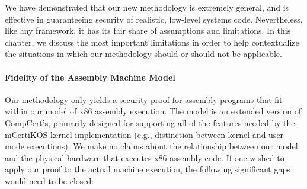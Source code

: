 \label{limitations-chapter}

We have demonstrated that our new methodology is extremely
general, and is effective in guaranteeing security of realistic,
low-level systems code. Nevertheless, like any framework, it
has its fair share of assumptions and limitations. In this 
chapter, we discuss the most important limitations in order to 
help contextualize the situations in which our methodology
should or should not be applicable.

\paragraph{Fidelity of the Assembly Machine Model}
Our methodology only yields a security proof for assembly
programs that fit within our model of x86 assembly execution. The
model is an extended version of CompCert's, primarily designed
for supporting all of the features needed by the mCertiKOS
kernel implementation (e.g., distinction between kernel and
user mode executions). We make no claims about the relationship
between our model and the physical hardware that executes x86 
assembly code. If one wished to apply our proof to the actual
machine execution, the following significant gaps would need
to be closed:
